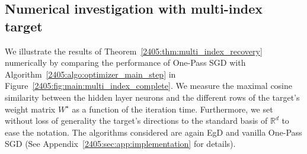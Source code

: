 \subsection{Numerical investigation with multi-index target}\label{2405:subsec:multi_numerics}
 
We illustrate the results of Theorem~\ref{2405:thm:multi_index_recovery} numerically by comparing the performance of One-Pass SGD with Algorithm~\ref{2405:algo:optimizer_main_step} in Figure~\ref{2405:fig:main:multi_index_complete}. We measure the maximal cosine similarity between the hidden layer neurons and the different rows of the target's weight matrix $W^\star$ as a function of the iteration time. Furthermore, we set without loss of generality the target's directions to the standard basis of $\mathbb{R}^d$ to ease the notation. The algorithms considered are again EgD and vanilla One-Pass SGD (See Appendix~\ref{2405:sec:app:implementation} for details).
